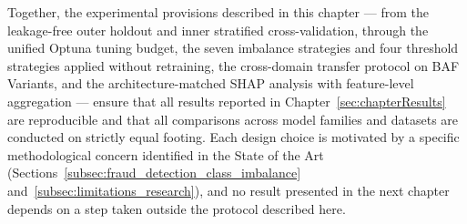 Together, the experimental provisions described in this chapter — from the leakage-free outer holdout and inner stratified cross-validation, through the unified Optuna tuning budget, the seven imbalance strategies and four threshold strategies applied without retraining, the cross-domain transfer protocol on BAF Variants, and the architecture-matched SHAP analysis with feature-level aggregation — ensure that all results reported in Chapter~\ref{sec:chapterResults} are reproducible and that all comparisons across model families and datasets are conducted on strictly equal footing. Each design choice is motivated by a specific methodological concern identified in the State of the Art (Sections~\ref{subsec:fraud_detection_class_imbalance} and~\ref{subsec:limitations_research}), and no result presented in the next chapter depends on a step taken outside the protocol described here.
